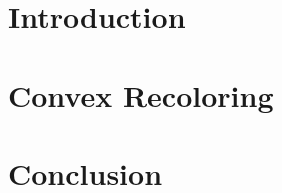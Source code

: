 \newcommand{\defpath}[1]{\def\path{content/#1}}
\newcommand{\add}[1]{}

\chapter{Introduction}
\defpath{introduction}
\add{introduction}

\chapter{Convex Recoloring}
\defpath{2cr}
\add{2cr}

\chapter{Conclusion}
\defpath{conclusion}
\add{conclusion}